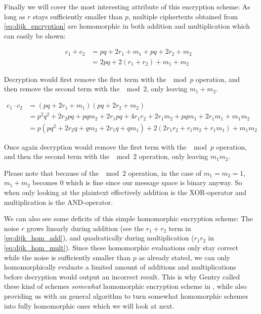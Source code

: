 Finally we will cover the most interesting attribute of this encryption scheme: As long as $r$ stays sufficiently smaller than $p$, multiple ciphertexts obtained from \ref{eq:dijk_encryption} are homomorphic in both addition and multiplication which can easily be shown:

\begin{align}
    c_1 + c_2 &= pq + 2 r_1 + m_1 + pq + 2 r_2 + m_2 \\
              &=2 pq + 2 \left( r_1 + r_2 \right) + m_1 + m_2
    \label{eq:dijk_hom_add}
\end{align}

Decryption would first remove the first term with the $\mod p$ operation, and then remove the second term with the $\mod 2$, only leaving $m_1 + m_2$.

\begin{align}
    c_1 \cdot c_2 &= \left(pq + 2r_1 + m_1 \right) \left( pq + 2r_2 + m_2 \right) \\
                  &= p^2 q^2 + 2 r_2 pq + pqm_2 + 2r_1pq + 4r_1r_2 + 2r_1m_2 + pqm_1 + 2r_1m_1 + m_1m_2\\
                  &= p\left(pq^2 + 2r_2q + qm_2 + 2r_1q + qm_1\right) + 2\left( 2r_1 r_2 + r_1m_2 + r_1 m_1 \right) + m_1 m_2
    \label{eq:dijk_hom_mult}
\end{align}

Once again decryption would remove the first term with the $\mod p$ operation, and then the second term with the $\mod 2$ operation, only leaving $m_1 m_2$.

Please note that because of the $\mod 2$ operation, in the case of $m_1 = m_2 = 1$, $m_1 + m_2$ becomes $0$ which is fine since our message space is binary anyway. So when only looking at the plaintext effectively addition is the XOR-operator and multiplication is the AND-operator.

We can also see some deficits of this simple homomorphic encryption scheme: The noise $r$ grows linearly during addition (see the $r_1 + r_2$ term in \ref{eq:dijk_hom_add}), and quadratically during multiplication ($r_1r_2$ in \ref{eq:dijk_hom_mult}). Since these homomorphic evaluations only stay correct while the noise is sufficiently smaller than $p$ as already stated, we can only homomorphically evaluate a limited amount of additions and multiplications before decryption would output an incorrect result. This is why Gentry called these kind of schemes \emph{somewhat} homomorphic encryption scheme in \cite{gentry_fully_2009}, while also providing us with an general algorithm to turn somewhat homomorphic schemes into fully homomorphic ones which we will look at next.

